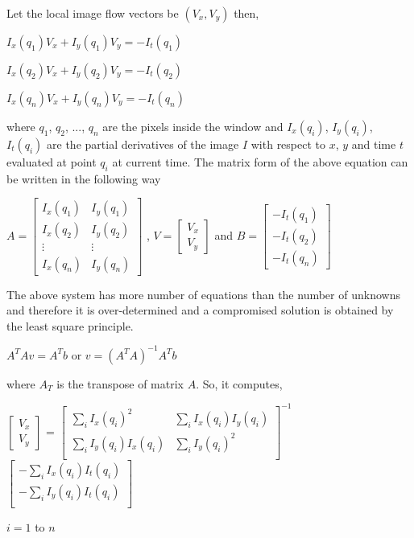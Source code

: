 \documentclass[a4paper]{aitthesis}
\begin{document}
Let the local image flow vectors be $(V_x, V_y)$
then,
\begin{center}
  $I_x(q_1)V_x + I_y(q_1)V_y = -I_t(q_1)$ 
\end{center}

\begin{center}
  $I_x(q_2)V_x + I_y(q_2)V_y = -I_t(q_2)$ 
\end{center}

\begin{center}
$I_x(q_n)V_x + I_y(q_n)V_y = -I_t(q_n)$
\end{center}
                       
where $q_1$, $q_2$, ..., $q_n$ are the pixels inside the window and $I_x(q_i)$, $I_y(q_i)$, $I_t(q_i)$ are the partial derivatives of the image $I$ with respect to $x$, $y$ and time $t$ evaluated at point $q_i$ at current time.
\newline The matrix form of the above equation can be written in the following way \newline
\begin{center}
$ A = \begin{bmatrix}
 I_x(q_1) & I_y(q_1) \\
 I_x(q_2) & I_y(q_2)\\
 \vdots & \vdots \\
 I_x(q_n) & I_y(q_n)
 \end{bmatrix}$ ,
 $V = \begin{bmatrix}
 V_x \\ 
 V_y
 \end{bmatrix}$
 and $ B = \begin{bmatrix}
 -I_t(q_1)\\
 -I_t(q_2)\\
 -I_t(q_n)
 \end{bmatrix}$
\end{center}
The above system has more number of equations than the number of unknowns and therefore it is over-determined and a compromised solution is obtained by the least square principle.
\begin{center}
$A^T Av = A^Tb$ or
$v = (A^TA)^{-1}A^Tb$
\end{center}
 where $A_T$  is the transpose of matrix $A$.
 \newline So, it computes,
\begin{center}
$\begin{bmatrix}
V_x \\
V_y
\end{bmatrix}$
= 
$\begin{bmatrix}
\sum_{i} I_x(q_i)^2 & \sum_{i} I_x(q_i)I_y(q_i)\\
\sum_{i} I_y(q_i)I_x(q_i) & \sum_{i} I_y(q_i)^2\\
\end{bmatrix} ^ {-1}$
$\begin{bmatrix}
-\sum_{i} I_x(q_i)I_t(q_i)\\
-\sum_{i} I_y(q_i)I_t(q_i)\\
\end{bmatrix}$
\end{center}
 $i = 1$ to $n$
\end{document}
